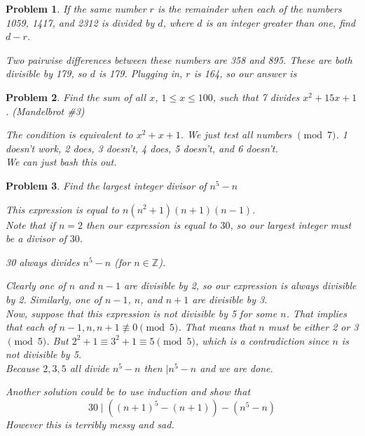 \documentclass[12pt]{scrartcl}
\newtheorem{a_problem}{Problem}
\begin{document}
\begin{a_problem}
	If the same number $r$ is the remainder when each of the numbers 1059, 1417, and 2312 is divided by $d$, where $d$ is an integer greater than one, find $d-r$.
	\begin{soln}
		Two pairwise differences between these numbers are 358 and 895. These are both divisible by 179, so $d$ is 179. Plugging in, $r$ is 164, so our answer is 
	\end{soln}
\end{a_problem}

\begin{a_problem}
	Find the sum of all $x$, $1 \leq x \leq 100$, such that 7 divides $x^2 + 15x + 1$. (Mandelbrot \#3)
	\begin{soln}
		The condition is equivalent to $x^2 + x + 1$.
		We just test all numbers $\pmod{7}$.
		1 doesn't work, 2 does, 3 doesn't, 4 does, 5 doesn't, and 6 doesn't. \\
		We can just bash this out.
	\end{soln}
\end{a_problem}

\begin{a_problem}
	Find the largest integer divisor of $n^5 - n$
	\begin{soln}
		This expression is equal to $n(n^2+1)(n+1)(n-1)$. \\
		Note that if $n=2$ then our expression is equal to $30$, so our largest integer must be a divisor of $30$. 
		\begin{claim*}
		30 always divides $n^5 - n$ (for $n \in \mathbb{Z}$). 
		\end{claim*}
		Clearly one of $n$ and $n-1$ are divisible by 2, so our expression is always divisible by 2. Similarly, one of $n-1$, $n$, and $n+1$ are divisible by 3. \\
		Now, suppose that this expression is not divisible by 5 for some $n$.
		That implies that each of $n-1, n, n+1 \not\equiv 0 \pmod{5}$.
		That means that $n$ must be either 2 or 3 $\pmod{5}$.
		But $2^2 + 1 \equiv 3^2 + 1 \equiv 5 \pmod{5}$, which is a contradiction since $n$ is not divisible by 5. \\
		Because $2,3,5$ all divide $n^5 - n$ then $\mid n^5 - n$ and we are done.
	\end{soln}
	\begin{remark}
		Another solution could be to use induction and show that 
		\[30 \mid ({(n+1)}^5 - (n+1)) - (n^5 - n)\]
		However this is terribly messy and sad.
	\end{remark}
\end{a_problem}
\end{document}
